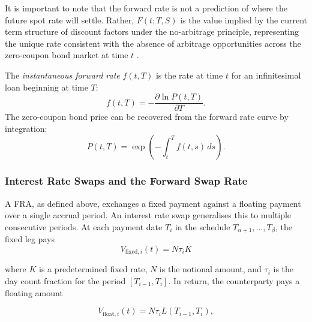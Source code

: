         \noindent
        It is important to note that the forward rate is not a prediction of where the future spot rate will settle. Rather, $F(t; T, S)$ is the value implied by the current term structure of discount factors under the no-arbitrage principle, representing the unique rate consistent with the absence of arbitrage opportunities across the zero-coupon bond market at time $t$
        \cite{BrigoMercurio2006}.
        
        \begin{definition}
        The \textit{instantaneous forward rate} $f(t,T)$ is the rate at time $t$ for an infinitesimal loan beginning at time $T$:
        \begin{equation} \label{eq:inst_fwd}
          f(t,T) = -\frac{\partial \ln P(t,T)}{\partial T}.
        \end{equation}
        The zero-coupon bond price can be recovered from the forward rate curve by integration:
        \begin{equation} \label{eq:bond_from_forward}
          P(t,T) = \exp\left(-\int_t^T f(t,s) \, ds\right).
        \end{equation}
        \end{definition}
    
    \subsubsection*{Interest Rate Swaps and the Forward Swap Rate}
        A FRA, as defined above, exchanges a fixed payment against a floating payment over a single accrual period. An interest rate swap generalises this to multiple consecutive periods. At each payment date $T_i$ in the schedule $T_{\alpha+1}, \ldots, T_{\beta}$, the fixed leg pays\\
        
        \begin{equation} \label{eq:fixed_leg}                                                                V_{\text{fixed},i}(t) = N \tau_i K
        \end{equation}
        
        \noindent
        where $K$ is a predetermined fixed rate, $N$ is the notional amount, and $\tau_i$ is the day count fraction for the period $[T_{i-1}, T_i]$. In return, the counterparty pays a floating
        amount
        
        \begin{equation} \label{eq:float_leg}
            V_{\text{float},i}(t) = N \tau_i L(T_{i-1}, T_i),
        \end{equation}
        
